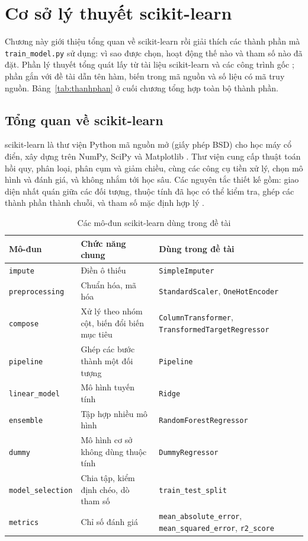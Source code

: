 \chapter{Cơ sở lý thuyết scikit-learn}\label{ch:lythuyet}

Chương này giới thiệu tổng quan về scikit-learn rồi giải thích các thành phần mà \texttt{train\_model.py} sử dụng: vì sao được chọn, hoạt động thế nào và tham số nào đã đặt. Phần lý thuyết tổng quát lấy từ tài liệu scikit-learn \cite{sklearn-guide} và các công trình gốc \cite{pedregosa2011,hoerl1970,breiman2001}; phần gắn với đề tài dẫn tên hàm, biến trong mã nguồn và số liệu có mã truy nguồn. Bảng~\ref{tab:thanhphan} ở cuối chương tổng hợp toàn bộ thành phần.

\section{Tổng quan về scikit-learn}\label{sec:tongquan}
scikit-learn là thư viện Python mã nguồn mở (giấy phép BSD) cho học máy cổ điển, xây dựng trên NumPy, SciPy và Matplotlib \cite{pedregosa2011}. Thư viện cung cấp thuật toán hồi quy, phân loại, phân cụm và giảm chiều, cùng các công cụ tiền xử lý, chọn mô hình và đánh giá, và không nhắm tới học sâu. Các nguyên tắc thiết kế gồm: giao diện nhất quán giữa các đối tượng, thuộc tính đã học có thể kiểm tra, ghép các thành phần thành chuỗi, và tham số mặc định hợp lý \cite{buitinck2013}.

\begin{table}[H]
\centering
\caption{Các mô-đun scikit-learn dùng trong đề tài}\label{tab:modun}
\small
\begin{tabular}{@{}L{3.2cm} L{4.4cm} L{5.0cm}@{}}
\toprule
Mô-đun & Chức năng chung & Dùng trong đề tài \\
\midrule
\texttt{impute} & Điền ô thiếu & \texttt{SimpleImputer} \\
\texttt{preprocessing} & Chuẩn hóa, mã hóa & \texttt{StandardScaler}, \texttt{OneHotEncoder} \\
\texttt{compose} & Xử lý theo nhóm cột, biến đổi biến mục tiêu & \texttt{ColumnTransformer}, \texttt{Transformed}\allowbreak\texttt{TargetRegressor} \\
\texttt{pipeline} & Ghép các bước thành một đối tượng & \texttt{Pipeline} \\
\texttt{linear\_model} & Mô hình tuyến tính & \texttt{Ridge} \\
\texttt{ensemble} & Tập hợp nhiều mô hình & \texttt{RandomForest}\allowbreak\texttt{Regressor} \\
\texttt{dummy} & Mô hình cơ sở không dùng thuộc tính & \texttt{DummyRegressor} \\
\texttt{model\_selection} & Chia tập, kiểm định chéo, dò tham số & \texttt{train\_test\_split} \\
\texttt{metrics} & Chỉ số đánh giá & \texttt{mean\_absolute\_error}, \texttt{mean\_squared\_error}, \texttt{r2\_score} \\
\bottomrule
\end{tabular}
\end{table}

